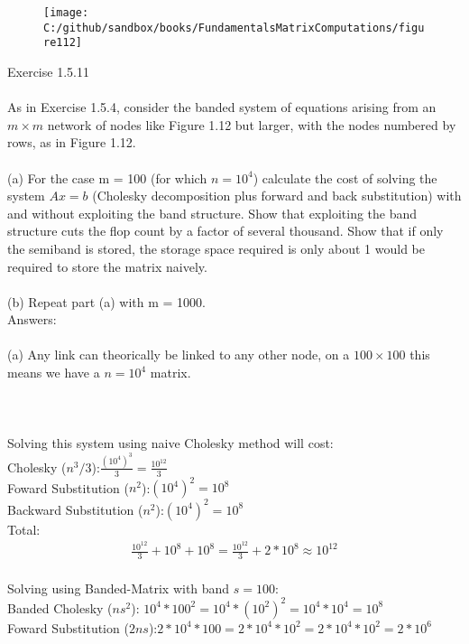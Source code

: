 \documentclass{article}
\begin{document}
	\begin{figure}
		\centering
		\texttt{[image: C:/github/sandbox/books/FundamentalsMatrixComputations/figure112]}
	\end{figure}
	Exercise 1.5.11\\
	\\
	As in Exercise 1.5.4, consider the banded system of equations arising from an $m \times m$ network of nodes like Figure 1.12 but larger, with the nodes numbered by rows, as in Figure 1.12.\\
	\\ 
	(a) For the case m = 100 (for which $n = 10^4$) calculate the cost of solving the system $Ax = b$ (Cholesky decomposition plus forward and back substitution) with and without exploiting the band structure. Show that exploiting the band structure cuts the flop count by a factor of several thousand. Show that if only the semiband is stored, the storage space required is only about 1%
	would be required to store the matrix naively.\\
	\\
	(b) Repeat part (a) with m = 1000. 
	\\
	Answers:\\
	\\		
	(a) Any link can theorically be linked to any other node, on a $100 \times 100$ this means we have a $n=10^4$ matrix.\\
	\\
	\\
	\\	
	Solving this system using naive Cholesky method will cost:\\
	Cholesky ($n^3/3$):$\frac{(10^4)^3}{3}=\frac{10^{12}}{3}$\\
	Foward Substitution ($n^2$):$(10^4)^2=10^8$\\
	Backward Substitution ($n^2$):$(10^4)^2=10^8$\\
	Total:\\
	\begin{align*}
		\frac{10^{12}}{3} + 10^8 + 10^8 = \frac{10^{12}}{3} + 2*10^8 \approx 10^{12}
	\end{align*}
	\\
	Solving using Banded-Matrix with band $s=100$:\\
	Banded Cholesky ($ns^2$): $ 10^4 * 100^2 = 10^4 * (10^2)^2 = 10^4 * 10^4 = 10^8  $\\
	Foward Substitution ($2ns$):$ 2*10^{4}*100 = 2*10^{4}*10^{2} = 2*10^{4}*10^{2} = 2*10^6$\\
\end{document}
